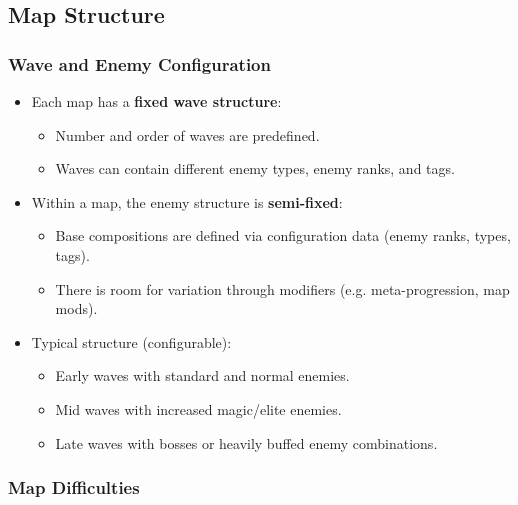 
\subsection{Map Structure}

\subsubsection*{Wave and Enemy Configuration}

\begin{itemize}
	\item Each map has a \textbf{fixed wave structure}:
	\begin{itemize}
		\item Number and order of waves are predefined.
		\item Waves can contain different enemy types, enemy ranks, and tags.
	\end{itemize}
	\item Within a map, the enemy structure is \textbf{semi-fixed}:
	\begin{itemize}
		\item Base compositions are defined via configuration data (enemy ranks, types, tags).
		\item There is room for variation through modifiers (e.g. meta-progression, map mods).
	\end{itemize}
	\item Typical structure (configurable):
	\begin{itemize}
		\item Early waves with standard and normal enemies.
		\item Mid waves with increased magic/elite enemies.
		\item Late waves with bosses or heavily buffed enemy combinations.
	\end{itemize}
\end{itemize}

\subsubsection*{Map Difficulties}

